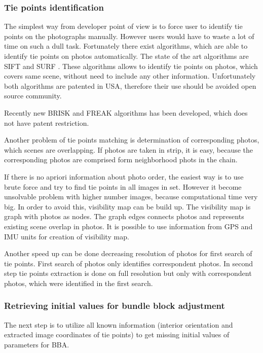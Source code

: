 \documentclass[a4paper,12pt]{article}
\begin{document}
\subsubsection{Tie points identification}

The simplest way from developer point of view is to force user to identify tie points on 
the photographs manually. However users would have to waste a lot of time on such a 
dull task. Fortunately there  exist algorithms, which are able to identify tie points on photos
automatically. The state of the art algorithms are SIFT \cite{wiki:SIFT} and SURF \cite{wiki:SURF}.
These algorithms allows to identify tie points on photos, which covers same scene, without need to include any other information.
Unfortunately both algorithms are patented in USA, therefore their use should be avoided open source community.

Recently new BRISK \cite{leutenegger2011brisk} and FREAK \cite{alahi2012freak} algorithms
has been developed, which does not have patent restriction. 

Another problem of tie points matching is determination of corresponding photos, which scenes are overlapping. 
If photos are taken in strip, it is easy, because the corresponding photos are comprised form neighborhood phots 
in the chain.

If there is no apriori information about photo order, the easiest way is to use brute force and 
try to find tie points in all images in set.
However it become unsolvable problem with higher number images, because 
computational time very big. In order to avoid this, visibility map \cite{barazzetti2010extraction} can be build up. 
The visibility map is graph with photos as nodes. The graph edges connects photos and represents existing scene overlap 
in photos.  It is possible to use information from GPS and IMU units for creation of visibility map.

Another speed up can be done decreasing resolution of photos 
for first search of tie points. First search of photos only identifies correspondent photos.
In second step tie points extraction is done on full resolution but only with correspondent photos,
which were identified in the first search.

\subsubsection{Retrieving initial values for bundle block adjustment}

The next step is to utilize all known information (interior orientation and extracted 
image coordinates of tie points) to get missing initial values of parameters for BBA. 
\end{document}
